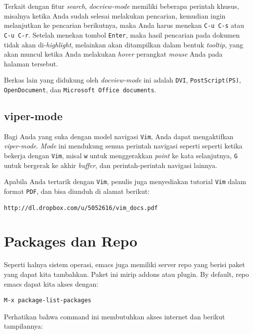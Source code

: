 \documentclass{article}
\begin{document}
Terkait dengan fitur \emph{search}, \emph{docview-mode} memiliki beberapa
perintah khusus, misalnya ketika Anda sudah selesai melakukan pencarian,
kemudian ingin melanjutkan ke pencarian berikutnya, maka Anda harus menekan
\verb=C-u C-s= atau \verb=C-u C-r=. Setelah menekan tombol \verb=Enter=, 
maka hasil pencarian pada dokumen tidak akan di-\emph{highlight}, melainkan
akan ditampilkan dalam bentuk \emph{tooltip}, yang akan muncul ketika Anda
melakukan \emph{hover} perangkat \emph{mouse} Anda pada halaman tersebut.

Berkas lain yang didukung oleh \emph{docview-mode} ini adalah \verb=DVI=, 
\verb=PostScript(PS)=, \verb=OpenDocument=, dan 
\verb=Microsoft Office documents=.

\subsection{viper-mode}
Bagi Anda yang suka dengan model navigasi \verb=Vim=, Anda dapat
mengaktifkan \emph{viper-mode}. \emph{Mode} ini mendukung semua perintah
navigasi seperti seperti ketika bekerja dengan \verb=Vim=, misal \verb=w=
untuk menggerakkan \emph{point} ke kata selanjutnya, \verb=G= untuk bergerak
ke akhir \emph{buffer}, dan perintah-perintah navigasi lainnya.

Apabila Anda tertarik dengan \verb=Vim=, penulis juga menyediakan tutorial
\verb=Vim= dalam format \verb=PDF=, dan bisa diunduh di alamat berikut:

\begin{verbatim}
http://dl.dropbox.com/u/5052616/vim_docs.pdf
\end{verbatim}

\section{Packages dan Repo}
Seperti halnya sistem operasi, emacs juga memiliki server repo yang 
berisi paket yang dapat kita tambahkan. Paket ini mirip addons atau 
plugin. By default, repo emacs dapat kita akses dengan:

\begin{verbatim}
M-x package-list-packages
\end{verbatim}

Perhatikan bahwa command ini membutuhkan akses internet dan 
berikut tampilannya:

\vspace{12pt}
\end{document}

